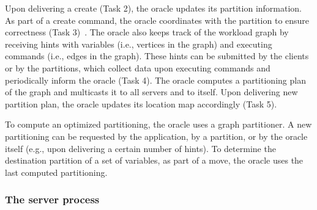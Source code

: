 Upon delivering a create (Task 2), the oracle updates its partition information.
As part of a create command, the oracle coordinates with the partition to ensure correctness (Task 3)~\cite{bezerra2014ssmr}.
%
The oracle also keeps track of the workload graph by receiving hints with variables (i.e., vertices in the graph) and executing commands (i.e., edges in the graph). These hints can be submitted by the clients or by the partitions, which collect data upon executing commands and periodically inform the oracle (Task 4).
The oracle computes a partitioning plan of the graph and multicasts it to all servers and to itself. Upon delivering new partition plan, the oracle updates its location map accordingly (Task 5).

To compute an optimized partitioning, the oracle uses a graph partitioner.
A new partitioning can be requested by the application, by a partition, or by the oracle itself (e.g., upon delivering a certain number of hints).
To determine the destination partition of a set of variables, as part of a move, the oracle uses 
the last computed partitioning.

\subsubsection{The server process} 

